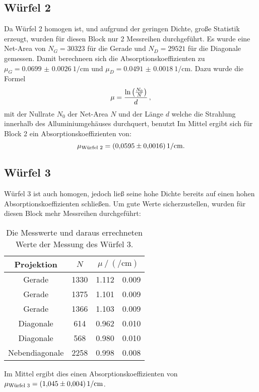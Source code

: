   \subsection{Würfel 2}
    Da Würfel 2 homogen ist, und aufgrund der geringen Dichte, große Statistik erzeugt, wurden für diesen Block nur 2 Messreihen durchgeführt.
    Es wurde eine Net-Area von $N_G=30323$ für die Gerade und $N_D=29521$ für die Diagonale gemessen.
    Damit berechneen sich die Absorptionskoeffizienten zu $\mu_G = \SI{0.0699(00026)}{1\per\centi\metre}$ und $\mu_D=\SI{0.0491(00018)}{1\per\centi\metre}$.
    Dazu wurde die Formel
    \begin{equation}
      \mu = \frac{\t{ln}\left(\frac{N_0}{N}\right)}{d} \, ,
    \end{equation}
    mit der Nullrate $N_0$ der Net-Area $N$ und der Länge $d$ welche die Strahlung innerhalb des Alluminiumgehäuses durchquert, benutzt
    Im Mittel ergibt sich für Block 2 ein Absorptionskoeffizienten von: 
    \begin{equation}
      \mu_\t{Würfel 2} = \SI{0.0595(00016)}{1\per\centi\metre}.
    \end{equation}

  \subsection{Würfel 3}
    Würfel 3 ist auch homogen, jedoch ließ seine hohe Dichte bereits auf einen hohen Absorptionskoeffizienten schließen. 
    Um gute Werte sicherzustellen, wurden für diesen Block mehr Messreihen durchgeführt:
    \begin{table}[H]
     \centering
     \caption{Die Messwerte und daraus errechneten Werte der Messung des Würfel 3.}
     \label{tab:w2}
     \begin{tabular}{c S[table-format=4.0] S[table-format=1.3] @{${}\pm{}$} S[table-format=1.3]}
       \toprule
       {Projektion} &  &  \\
       \midrule
       Gerade & 1330 & 1.112 & 0.009 \\
       Gerade & 1375 & 1.101 & 0.009 \\
       Gerade & 1366 & 1.103 & 0.009 \\
       Diagonale & 614 & 0.962 & 0.010 \\
       Diagonale & 568 & 0.980 & 0.010 \\
       Nebendiagonale & 2258 & 0.998 & 0.008 \\
       \bottomrule  
     \end{tabular}
    \end{table} 
    \noindent
    Im Mittel ergibt dies einen Absorptionskoeffizienten von $\mu_\t{Würfel 3} = \SI{1.045(0004)}{1\per\centi\metre}$.

